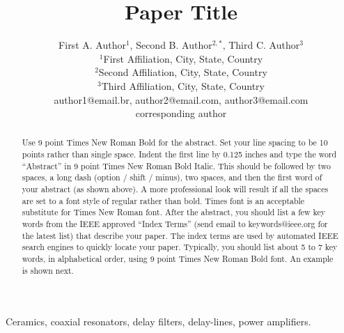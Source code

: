 \documentclass[conference]{IEEEtran}
\begin{document}
\title{Paper Title\\}


\author{First A. Author$^{1}$, Second B. Author$^{2,*}$, Third C. Author$^{3}$\\
	\normalsize $^{1}$First Affiliation, City, State, Country\\
	\normalsize $^{2}$Second Affiliation, City, State, Country\\
	\normalsize $^{3}$Third Affiliation, City, State, Country\\
	\normalsize author1@email.br, author2@email.com, author3@email.com\\
	\normalsize *corresponding author
}


\maketitle

\begin{abstract}
Use 9 point Times New Roman Bold for the abstract. Set your line spacing to be 10 points rather than single space. Indent the first line by 0.125 inches and type the word ``Abstract'' in 9 point Times New Roman Bold Italic. This should be followed by two spaces, a long dash (option / shift / minus), two spaces, and then the first word of your abstract (as shown above). A more professional look will result if all the spaces are set to a font style of regular rather than bold. Times font is an acceptable substitute for Times New Roman font. After the abstract, you should list a few key words from the IEEE approved “Index Terms” (send email to keywords@ieee.org for the latest list) that describe your paper. The index terms are used by automated IEEE search engines to quickly locate your paper. Typically, you should list about 5 to 7 key words, in alphabetical order, using 9 point Times New Roman Bold font. An example is shown next.
\end{abstract}
\IEEEoverridecommandlockouts
\begin{keywords}
Ceramics, coaxial resonators, delay filters, delay-lines, power
amplifiers.
\end{keywords}
\end{document}
